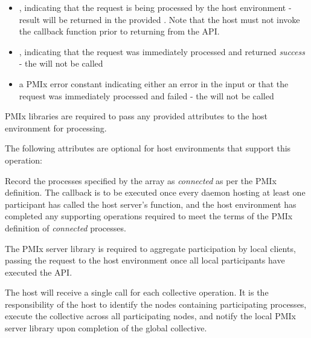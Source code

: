 \begin{itemize}
    \item {}, indicating that the request is being processed by the host environment - result will be returned in the provided . Note that the host must not invoke the callback function prior to returning from the \ac{API}.
    \item {}, indicating that the request was immediately processed and returned \textit{success} - the  will not be called
    \item a PMIx error constant indicating either an error in the input or that the request was immediately processed and failed - the  will not be called
\end{itemize}

\reqattrstart
\ac{PMIx} libraries are required to pass any provided attributes to the host environment for processing.
\reqattrend

\optattrstart
The following attributes are optional for host environments that support this operation:


\optattrend

\descr

Record the processes specified by the  array as \textit{connected} as per the \ac{PMIx} definition. The callback is to be executed once every daemon hosting at least one participant has called the host server's  function, and the host environment has completed any supporting operations required to meet the terms of the \ac{PMIx} definition of \textit{connected} processes.

\adviceimplstart
The \ac{PMIx} server library is required to aggregate participation by local clients, passing the request to the host environment once all local participants have executed the \ac{API}.
\adviceimplend

\advicermstart
The host will receive a single call for each collective operation. It is the responsibility of the host to identify the nodes containing participating processes, execute the collective across all participating nodes, and notify the local \ac{PMIx} server library upon completion of the global collective.
\advicermend


